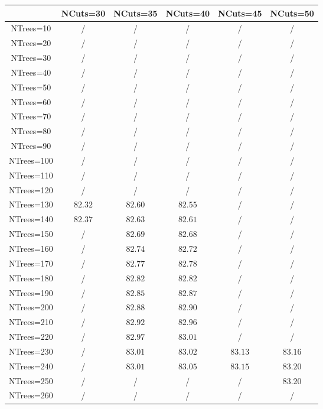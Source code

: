 \centering
\begin{tabular}{|c|c|c|c|c|c|} \hline
 & NCuts=30 & NCuts=35 & NCuts=40 & NCuts=45 & NCuts=50\\\hline
NTrees=10 &  / &  / &  / &  / &  /\\\hline
NTrees=20 &  / &  / &  / &  / &  /\\\hline
NTrees=30 &  / &  / &  / &  / &  /\\\hline
NTrees=40 &  / &  / &  / &  / &  /\\\hline
NTrees=50 &  / &  / &  / &  / &  /\\\hline
NTrees=60 &  / &  / &  / &  / &  /\\\hline
NTrees=70 &  / &  / &  / &  / &  /\\\hline
NTrees=80 &  / &  / &  / &  / &  /\\\hline
NTrees=90 &  / &  / &  / &  / &  /\\\hline
NTrees=100 &  / &  / &  / &  / &  /\\\hline
NTrees=110 &  / &  / &  / &  / &  /\\\hline
NTrees=120 &  / &  / &  / &  / &  /\\\hline
NTrees=130 & $82.32$ & $82.60$ & $82.55$ &  / &  /\\\hline
NTrees=140 & $82.37$ & $82.63$ & $82.61$ &  / &  /\\\hline
NTrees=150 &  / & $82.69$ & $82.68$ &  / &  /\\\hline
NTrees=160 &  / & $82.74$ & $82.72$ &  / &  /\\\hline
NTrees=170 &  / & $82.77$ & $82.78$ &  / &  /\\\hline
NTrees=180 &  / & $82.82$ & $82.82$ &  / &  /\\\hline
NTrees=190 &  / & $82.85$ & $82.87$ &  / &  /\\\hline
NTrees=200 &  / & $82.88$ & $82.90$ &  / &  /\\\hline
NTrees=210 &  / & $82.92$ & $82.96$ &  / &  /\\\hline
NTrees=220 &  / & $82.97$ & $83.01$ &  / &  /\\\hline
NTrees=230 &  / & $83.01$ & $83.02$ & $83.13$ & $83.16$\\\hline
NTrees=240 &  / & $83.01$ & $83.05$ & $83.15$ & $83.20$\\\hline
NTrees=250 &  / &  / &  / &  / & $83.20$\\\hline
NTrees=260 &  / &  / &  / &  / &  /\\\hline
\end{tabular}
